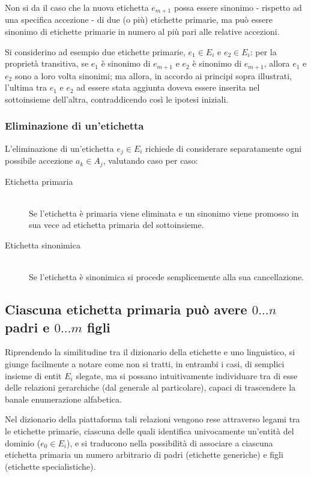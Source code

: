 \documentclass[10pt,a4paper,headinclude,footinclude,hidelinks]{scrreprt} %
\begin{document}
	Non si da il caso che la nuova etichetta $e_{m+1}$ possa essere sinonimo - rispetto ad una specifica accezione - di due (o più) etichette primarie, ma può essere sinonimo di etichette primarie in numero al più pari alle relative accezioni.

	Si considerino ad esempio due etichette primarie, $e_1 \in E_i$ e $e_2 \in E_i$: per la proprietà transitiva, se $e_1$ è sinonimo di $e_{m+1}$ e $e_2$ è sinonimo di $e_{m+1}$, allora $e_1$ e $e_2$ sono a loro volta sinonimi; ma allora, in accordo ai principi sopra illustrati, l'ultima tra $e_1$ e $e_2$ ad essere stata aggiunta doveva essere inserita nel sottoinsieme dell'altra, contraddicendo così le ipotesi iniziali.

	\subsubsection{Eliminazione di un'etichetta}
	L'eliminazione di un'etichetta $e_j \in E_i$ richiede di considerare separatamente ogni possibile accezione $a_k \in A_j$, valutando caso per caso:
	\begin{description}
	\item[Etichetta primaria]\hfill \\
	Se l'etichetta è primaria viene eliminata e un sinonimo viene promosso in sua vece ad etichetta primaria del sottoinsieme.
 	\item[Etichetta sinonimica] \hfill \\
	Se l'etichetta è sinonimica si procede semplicemente alla sua cancellazione.
	\end{description}

	\subsection[Gerarchia]{Ciascuna etichetta primaria può avere $0...n$ padri e $0...m$ figli}
	Riprendendo la similitudine tra il dizionario della etichette e uno linguistico, si giunge facilmente a notare come non si tratti, in entrambi i casi, di semplici insieme di entit $E_i$ slegate, ma si possano intuitivamente individuare tra di esse delle relazioni gerarchiche (dal generale al particolare), capaci di trascendere la banale enumerazione alfabetica.

	Nel dizionario della piattaforma tali relazioni vengono rese attraverso legami tra le etichette primarie, ciascuna delle quali identifica univocamente un'entità del dominio ($e_0 \in E_i$), e si traducono nella possibilità di associare a ciascuna etichetta primaria un numero arbitrario di padri (etichette generiche) e figli (etichette specialistiche).
\end{document}
